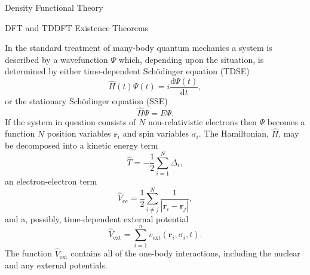 \documentclass[letterpaper, 12 pt]{report}
\begin{document}
\begin{chapter}{Density Functional Theory \label{chap:dft}}

   \begin{section}{DFT and TDDFT Existence Theorems \label{sec:dft}}

      In the standard treatment of many-body quantum mechanics a system is described by a wavefunction
      $\Psi$ which, depending upon the situation, is determined by either time-dependent Sch\"{o}dinger
      equation (TDSE)
      \begin{equation} \label{eq:tdse}
         \hat{H}(t) \Psi(t) = i \frac{\mathrm{d} \Psi(t)}{\mathrm{d} t},
      \end{equation}
      or the stationary Sch\"{o}dinger equation (SSE)
      \begin{equation} \label{eq:sse}
         \hat{H} \Psi = E \Psi.
      \end{equation}
      If the system in question consists of $N$ non-relativistic electrons then $\Psi$ becomes a
      function $N$ position variables $\mathbf{r}_i$ and spin variables $\sigma_i$. The Hamiltonian,
      $\hat{H}$, may be decomposed into a kinetic energy term
      \begin{equation} \label{eq:Top} %
         \hat{T} = -\frac{1}{2} \sum\limits^{N}_{i=1} \Delta_i,
      \end{equation}
      an electron-electron term
      \begin{equation} \label{eq:Vee} %
         \hat{V}_{ee} = \frac{1}{2} \sum\limits^{N}_{i \neq j}
                        \frac{1}{\left| \mathbf{r}_i - \mathbf{r}_j \right|},
      \end{equation}
      and a, possibly, time-dependent external potential
      \begin{equation} \label{eq:Vext}
         \hat{V}_\mathrm{ext} = \sum\limits^{n}_{i = 1} v_\mathrm{ext} (\mathbf{r}_i, \sigma_i, t).
      \end{equation}
      The function $\hat{V}_\mathrm{ext}$ contains all of the one-body interactions, including the
      nuclear and any external potentials.


\end{section}
\end{chapter}
\end{document}
